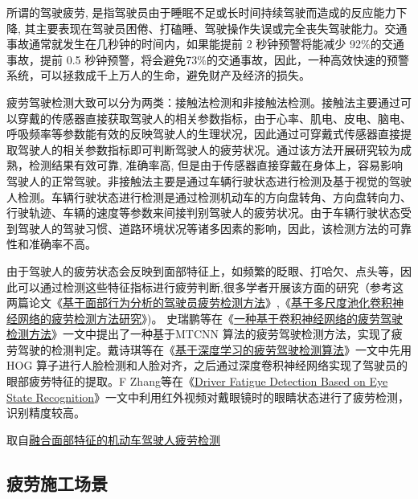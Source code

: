 所谓的驾驶疲劳, 是指驾驶员由于睡眠不足或长时间持续驾驶而造成的反应能力下降, 其主要表现在驾驶员困倦、打磕睡、驾驶操作失误或完全丧失驾驶能力。交通事故通常就发生在几秒钟的时间内，如果能提前 2 秒钟预警将能减少 92$\%$的交通事故，提前 0.5 秒钟预警，将会避免73$\%$的交通事故，因此，一种高效快速的预警系统，可以拯救成千上万人的生命，避免财产及经济的损失。

疲劳驾驶检测大致可以分为两类：接触法检测和非接触法检测。接触法主要通过可以穿戴的传感器直接获取驾驶人的相关参数指标，由于心率、肌电、皮电、脑电、呼吸频率等参数能有效的反映驾驶人的生理状况，因此通过可穿戴式传感器直接提取驾驶人的相关参数指标即可判断驾驶人的疲劳状况。通过该方法开展研究较为成熟，检测结果有效可靠, 准确率高, 但是由于传感器直接穿戴在身体上，容易影响驾驶人的正常驾驶。非接触法主要是通过车辆行驶状态进行检测及基于视觉的驾驶人检测。车辆行驶状态进行检测是通过检测机动车的方向盘转角、方向盘转向力、行驶轨迹、车辆的速度等参数来间接判别驾驶人的疲劳状况。由于车辆行驶状态受到驾驶人的驾驶习惯、道路环境状况等诸多因素的影响，因此，该检测方法的可靠性和准确率不高。

由于驾驶人的疲劳状态会反映到面部特征上，如频繁的眨眼、打哈欠、点头等，因此可以通过检测这些特征指标进行疲劳判断,很多学者开展该方面的研究（参考这两篇论文《\href{https://xueshu.baidu.com/usercenter/paper/show?paperid=671cbaaddd0c5e8365feebf7cc1145ad&site=xueshu_se&hitarticle=1}{基于面部行为分析的驾驶员疲劳检测方法}》,《\href{https://xueshu.baidu.com/usercenter/paper/show?paperid=1p5k08u0hf5y04b07v1s0gx0nu129126&site=xueshu_se&hitarticle=1}{基于多尺度池化卷积神经网络的疲劳检测方法研究}》)。 史瑞鹏等在《\href{https://xueshu.baidu.com/usercenter/paper/show?paperid=126t08102r3x0r002v760pj018696892&site=xueshu_se&hitarticle=1}{一种基于卷积神经网络的疲劳驾驶检测方法}》一文中提出了一种基于MTCNN 算法的疲劳驾驶检测方法，实现了疲劳驾驶的检测判定。戴诗琪等在《\href{https://xueshu.baidu.com/usercenter/paper/show?paperid=cd41c261d06bee71082a1f570326e23e&site=xueshu_se}{基于深度学习的疲劳驾驶检测算法}》一文中先用 HOG 算子进行人脸检测和人脸对齐，之后通过深度卷积神经网络实现了驾驶员的眼部疲劳特征的提取。F Zhang等在《\href{https://xueshu.baidu.com/usercenter/paper/show?paperid=b02b21c4b90a17cbe1ee9bb2004d0b6f&site=xueshu_se&hitarticle=1}{Driver Fatigue Detection Based on Eye State Recognition}》一文中利用红外视频对戴眼镜时的眼睛状态进行了疲劳检测，识别精度较高。

取自\href{https://kns.cnki.net/kcms/detail/61.1114.th.20201228.1452.013.html}{融合面部特征的机动车驾驶人疲劳检测}

\subsection{疲劳施工场景}

